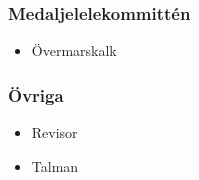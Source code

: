 \documentclass{dsekprotokoll}
\begin{document}
\begin{multicols}{2}
  \subsubsection*{Medaljelelekommittén}
  \begin{itemize}
    \item Övermarskalk
  \end{itemize}

  \subsubsection*{Övriga}
  \begin{itemize}
    \item Revisor
    \item Talman
  \end{itemize}

\end{multicols}
\end{document}
